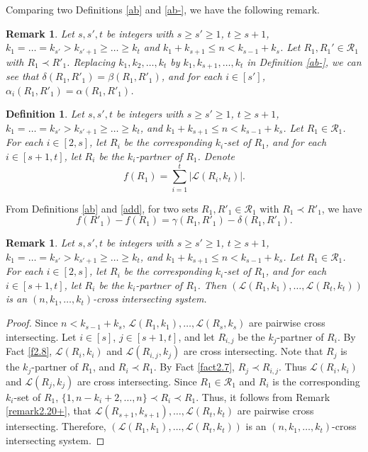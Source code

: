 \documentclass[a4paper,11pt]{article}
\newtheorem{definition}[theorem]{Definition}
\newtheorem{remark}[theorem]{Remark}
\begin{document}
Comparing two Definitions \ref{ab} and \ref{ab-}, we have the following remark.
\begin{remark}\label{remark4.14}
Let $s, s', t$ be integers with $s\geq s'\geq 1$, $t\geq s+1$, $k_1=\dots=k_{s'}> k_{s'+1}\geq\dots\geq k_t$ and $k_1+k_{s+1}\leq n <k_{s-1}+k_s$.
Let $R_1, R_1' \in \mathcal{R}_1$ with $R_1\prec R'_1$.
Replacing $k_1, k_2, \dots, k_t$ by $k_1, k_{s+1}, \dots, k_t$ in Definition \ref{ab-},
  we can see  that $\delta(R_1, R'_1)=\beta(R_1, R'_1)$, and  for each $i\in [s']$,
$
\alpha_i(R_1, R'_1)=\alpha(R_1, R'_1)$.
\end{remark}


\begin{definition}\label{deff}
Let $s, s', t$ be integers with $s\geq s'\geq 1$, $t\geq s+1$, $k_1=\dots=k_{s'}> k_{s'+1}\geq\dots\geq k_t$, and $k_1+k_{s+1}\leq n <k_{s-1}+k_s$.
Let $R_1\in \mathcal{R}_1$. For each $i\in [2, s]$, let $R_i$ be  the corresponding $k_i$-set of $R_1$, and for each $i\in [s+1, t]$, let $R_i$ be the $k_i$-partner of $R_1$. Denote
$$f(R_1)=\sum_{i=1}^t |\mathcal{L}(R_i, k_t)|.$$
\end{definition}


From Definitions \ref{ab} and \ref{add}, for two sets $R_1, R'_1\in \mathcal{R}_1$ with $R_1\prec R'_1$, we have
\begin{equation}\label{7-19-4}
f(R'_1)-f(R_1)=\gamma(R_1, R'_1)-\delta(R_1, R'_1).
\end{equation}

\begin{remark}\label{7-19-1}
Let $s, s', t$ be integers with $s\geq s'\geq 1$, $t\geq s+1$, $k_1=\dots=k_{s'}> k_{s'+1}\geq\dots\geq k_t$, and $k_1+k_{s+1}\leq n <k_{s-1}+k_s$.
Let $R_1\in \mathcal{R}_1$. For each $i\in [2, s]$, let $R_i$ be  the corresponding $k_i$-set of $R_1$, and for each $i\in [s+1, t]$, let $R_i$ be the $k_i$-partner of $R_1$.
Then $(\mathcal{L}(R_1, k_1), \dots, \mathcal{L}(R_t, k_t))$ is an $(n, k_1, \dots, k_t)$-cross intersecting system.
\end{remark}

\begin{proof}
Since $n <k_{s-1}+k_s$, $\mathcal{L}(R_{1}, k_{1}), \dots, \mathcal{L}(R_s, k_s)$ are pairwise cross intersecting.
Let $i\in [s]$,  $j\in [s+1, t]$, and let $R_{i, j}$ be the $k_j$-partner of $R_i$.
By Fact \ref{f2.8}, $\mathcal{L}(R_i, k_i)$ and $\mathcal{L}(R_{i, j}, k_j)$ are cross intersecting.
Note that $R_j$ is the $k_j$-partner of $R_1$, and $R_i\prec R_1$.
By Fact \ref{fact2.7}, $R_j \prec R_{i, j}$.
Thus $\mathcal{L}(R_i, k_i)$ and  $\mathcal{L}(R_j, k_j)$ are cross intersecting.
Since $R_1\in \mathcal{R}_1$ and $R_i$ is  the corresponding $k_i$-set of $R_1$, $\{1, n-k_i+2, \dots, n\}\prec R_i\prec R_1$. Thus, it follows from Remark \ref{remark2.20+}, that $\mathcal{L}(R_{s+1}, k_{s+1}), \dots, \mathcal{L}(R_t, k_t)$ are pairwise cross intersecting. Therefore, $(\mathcal{L}(R_1, k_1), \dots, \mathcal{L}(R_t, k_t))$ is an $(n, k_1, \dots, k_t)$-cross intersecting system.
\end{proof}
\end{document}
